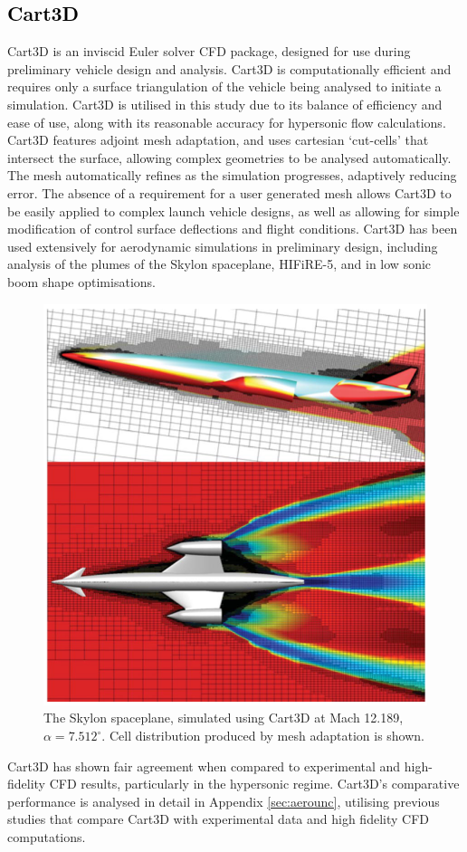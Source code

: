 \textcolor{black}{
\subsection{Cart3D}\label{sec:Cart3d}
}
\noindent
Cart3D is an inviscid Euler solver CFD package, designed for use during preliminary vehicle design and analysis\cite{Almosnino2016}. Cart3D is computationally efficient and requires only a surface triangulation of the vehicle being analysed to initiate a simulation. Cart3D is utilised in this study due to its balance of efficiency and ease of use, along with its reasonable accuracy for hypersonic flow calculations\cite{Abeynayake2013a,Ward2018,Kiris2011}. Cart3D features adjoint mesh adaptation, and uses cartesian `cut-cells' that intersect the surface, allowing complex geometries to be analysed automatically. The mesh automatically refines as the simulation progresses, adaptively reducing error. The absence of a requirement for a user generated mesh allows Cart3D to be easily applied to complex launch vehicle designs, as well as allowing for simple modification of control surface deflections and flight conditions. 
Cart3D has been used extensively for aerodynamic simulations in preliminary design, including analysis of the plumes of the Skylon spaceplane\cite{Mehta2016}, HIFiRE-5\cite{Kimmel2010}, and in low sonic boom shape optimisations\cite{Aftosmis2011}. 
\begin{figure}[ht]
\centering
\includegraphics[width=0.6\linewidth]{figures/2_literature-review/Skylon-Cart3D}
\caption{The Skylon spaceplane, simulated using Cart3D at Mach 12.189, $\alpha=7.512^\circ$\cite{Mehta2016}. Cell distribution produced by mesh adaptation is shown.}
\label{fig:Skylon-Cart3D}
\end{figure}
Cart3D has shown fair agreement when compared to experimental and high-fidelity CFD results\cite{Abeynayake2013a,Ward2018,Kiris2011}, particularly in the hypersonic regime. Cart3D's comparative performance is analysed in detail in Appendix \ref{sec:aerounc}, utilising previous studies that compare Cart3D with experimental data and high fidelity CFD computations. 





